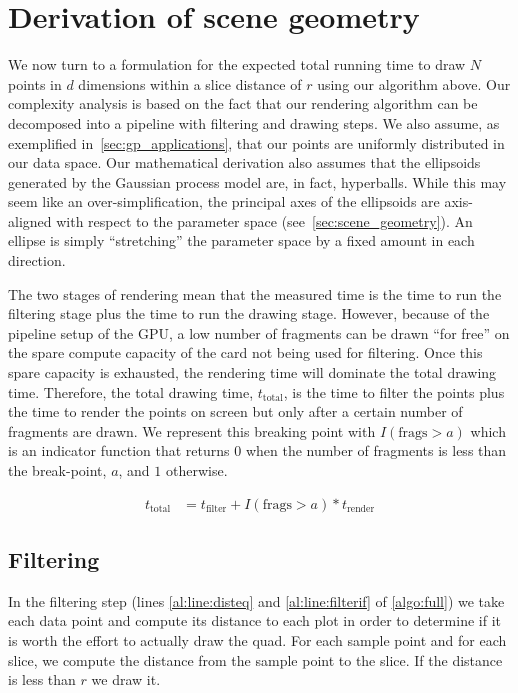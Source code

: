 \section{Derivation of scene geometry}
\label{sec:derivation}

We now turn to a formulation for the expected total running time to draw $N$
points in $d$ dimensions within a slice distance of $r$ using our algorithm 
above. Our complexity
analysis is based on the fact that our rendering algorithm can be decomposed
into a pipeline with filtering and drawing steps. We also assume, as
exemplified in~\autoref{sec:gp_applications}, that our points are uniformly
distributed in our data space.  Our mathematical derivation also assumes that
the ellipsoids generated by the Gaussian process model are, in fact,
hyperballs. While this may seem like an over-simplification, the principal
axes of the ellipsoids are axis-aligned with respect to the parameter 
space (see~\autoref{sec:scene_geometry}).
An ellipse is simply ``stretching'' the parameter space
by a fixed amount in each direction.

The two stages of rendering mean that
the measured time is the time to run the
filtering stage plus the time to run the drawing stage.  However, because
of the pipeline setup of the GPU, a low number of fragments can be drawn
``for free'' on the spare compute capacity of the card not being used for filtering.
Once this spare capacity is exhausted, the rendering time will dominate the
total drawing time.
Therefore,
the total drawing time, $t_\text{total}$, is the time to filter the points
plus the time to render the points on screen but only after a certain 
number of fragments are drawn.  We represent this breaking point with
$I(\text{frags} > a)$ which is an indicator function that returns $0$ when
the number of fragments is less than the break-point, $a$, and $1$ otherwise.

\begin{align}
  t_\text{total} &= t_\text{filter} + I(\text{frags}>a) * t_\text{render}
  \label{eq:acttotal-H}
\end{align}

\subsection{Filtering}
\label{filtering}

In the filtering step (lines \autoref{al:line:disteq} and 
\autoref{al:line:filterif} of \autoref{algo:full}) we take each data
point and compute its distance to each plot in order to determine if it is
worth the effort to actually draw the quad. For each sample point and for each
slice, we compute the distance from the sample point to the slice. If the
distance is less than $r$ we draw it.

